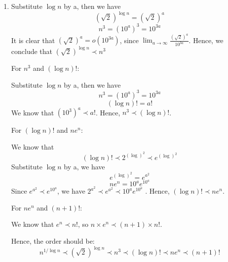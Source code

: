 \documentclass[12pt,a4paper]{article}
\makeatletter
\newtheorem*{solution}{Solution}
\theoremstyle{definition}
\renewenvironment{solution}[1][Solution] {\par\pushQED{\qed}\normalfont\topsep6\p@\@plus6\p@\relax\trivlist\item[\hskip\labelsep\bfseries#1\@addpunct{.}]\ignorespaces}{\popQED\endtrivlist\@endpefalse} \makeatother
\makeatother
\begin{document}
\begin{enumerate}
\begin{solution}
    Substitute $\log n$ by a, then we have $$(\sqrt{2})^{\log n}=(\sqrt{2})^a$$ $$n^3={(10^a)}^3=10^{3a}$$It is clear that $(\sqrt{2})^a=o(10^{3a})$, since ${\lim_{a\to \infty}} \frac{(\sqrt{2})^a}{10^{3a}}$. Hence, we conclude that $(\sqrt{2})^{\log n} \prec n^3$
    
For $n^3$ and $(\log n)!$:

Substitute $\log n$ by a, then we have $$n^3={(10^a)}^3=10^{3a}$$ $$(\log n)!=a!$$We know that ${(10^3)}^a\prec a!$. Hence, $n^3 \prec (\log n)!$.

For $(\log n)!$ and $ne^n$:

We know that $$(\log n)!\prec 2^{(\log)^2}\prec e^{(\log)^2}$$
Substitute $\log n$ by a, we have $$e^{(\log)^2}=e^{a^2}$$
$$ne^n={10^ae^{10^a}}$$
Since $e^{a^2}\prec e^{10^a}$, we have $2^{a^2}\prec e^{a^2}\prec 10^ae^{10^a}$
. Hence, $(\log n)!\prec ne^n$.

For $ne^n$ and $(n+1)!$:

We know that $e^n\prec n!$, so $n\times e^n \prec (n+1)\times n!$.

Hence, the order should be:$$n^{1/\log n} \prec (\sqrt{2})^{\log n} \prec n^3 \prec (\log n)! \prec ne^n \prec (n+1)!$$
\end{solution}

\end{enumerate}

\end{document}
